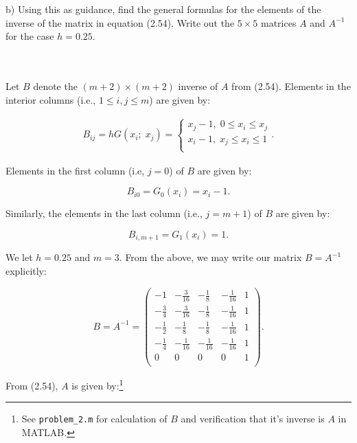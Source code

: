 \pagebreak
b) Using this as guidance, find the general formulas for the elements of the inverse of the matrix in equation (2.54).
   Write out the $5 \times 5$ matrices $A$ and $A^{-1}$ for the case $h = 0.25$.

\begin{solution}\ \\\\
    Let $B$ denote the $(m+2) \times (m+2)$ inverse of $A$ from (2.54). Elements in the interior columns 
    (i.e., $1 \le i,j \le m$) are given by:

    \begin{align*}
    B_{ij} = hG(x_i;\; x_j) = \begin{cases}
                                x_j - 1,\; 0 \le x_i \le x_j \\
                                x_i - 1,\; x_j \le x_i \le 1 \\
                            \end{cases}.
    \end{align*}

    Elements in the first column (i.e, $j = 0$) of $B$ are given by:

    $$
    B_{i0} = G_0(x_i) = x_i - 1.
    $$

    Similarly, the elements in the last column (i.e., $j = m + 1$) of $B$ are given by:

    $$
    B_{i,m+1} = G_1(x_i) = 1.
    $$

    We let $h = 0.25$ and $m = 3$. From the above, we may write our matrix $B = A^{-1}$ explicitly:


    \begingroup
    \renewcommand*{\arraystretch}{1.5}
    $$
        B =A^{-1} =
        \begin{pmatrix}
                      -1 & -\frac{3}{16} &  -\frac{1}{8} & -\frac{1}{16} & 1 \\
            -\frac{3}{4} & -\frac{3}{16} &  -\frac{1}{8} & -\frac{1}{16} & 1 \\
            -\frac{1}{2} &  -\frac{1}{8} &  -\frac{1}{8} & -\frac{1}{16} & 1 \\
            -\frac{1}{4} & -\frac{1}{16} & -\frac{1}{16} & -\frac{1}{16} & 1 \\
                       0 &             0 &             0 &             0 & 1 \\
        \end{pmatrix}.
    $$
    \endgroup

    From (2.54), $A$ is given by:\footnote{
        See \texttt{problem\_2.m} for calculation of $B$ and verification that it's inverse is $A$ in MATLAB.
    }


\end{solution}

